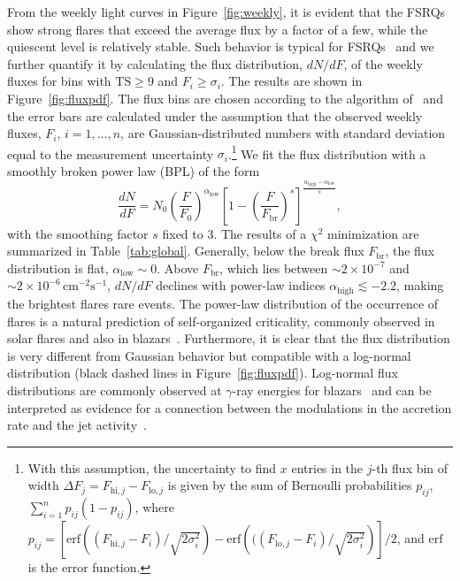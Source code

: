\documentclass[twocolumn,linenumbers]{aastex62}
\newcommand{\gray}{$\gamma$-ray\xspace}
\begin{document}
From the weekly light curves in Figure~\ref{fig:weekly}, it is evident that the FSRQs show strong flares that exceed the average flux by a factor of a few, while the quiescent level is relatively stable. 
Such behavior is typical for FSRQs~\citet{} and we 
further quantify it by calculating the flux distribution, $dN/dF$, of the weekly fluxes for bins with $\mathrm{TS} \geqslant 9$ and $F_i \geqslant \sigma_i$. 
The results are shown in Figure~\ref{fig:fluxpdf}. The flux bins are chosen according to the algorithm of~\citet{knuth2006} and the error bars are calculated under the assumption that the observed weekly fluxes, $F_i$, $i = 1,\ldots,n$, are Gaussian-distributed numbers with standard deviation equal to the measurement uncertainty $\sigma_i$.\footnote{
With this assumption, the uncertainty to find $x$ entries in the $j$-th flux bin of width $\Delta F_j = F_{\mathrm{hi},j} - F_{\mathrm{lo},j}$ is given by the sum of Bernoulli probabilities $p_{ij}$, $\sum_{i = 1}^n p_{ij}(1-p_{ij})$, where $p_{ij} =  \left[\mathrm{erf}\left((F_{\mathrm{hi},j} - F_i) / \sqrt{2\sigma_i^2}\right) - \mathrm{erf}\left(((F_{\mathrm{lo},j} - F_i) / \sqrt{2\sigma_i^2}\right)\right]/2$, and $\mathrm{erf}$ is the error function.
}
We fit the flux distribution with a smoothly broken power law (BPL) of the form 
\begin{equation}
    \frac{dN}{dF} = N_0 \left( \frac{F}{F_0}\right)^{\alpha_\mathrm{low}}
        \left[ 1 - \left(\frac{F}{F_\mathrm{br}}\right)^s \right]^{\frac{\alpha_\mathrm{high} - \alpha_\mathrm{low}}{s}},
        \label{eq:dndf}
\end{equation}
with the smoothing factor $s$ fixed to 3. 
The results of a $\chi^2$ minimization are summarized in Table~\ref{tab:global}.
Generally, below the break flux $F_\mathrm{br}$, the flux distribution is flat, $\alpha_\mathrm{low}\sim 0$.
Above $F_\mathrm{br}$, 
which lies between $\sim2\times10^{-7}$ and $\sim2\times10^{-6}\,\mathrm{cm}^{-2}\mathrm{s}^{-1}$, $dN/dF$ declines  with power-law indices $\alpha_\mathrm{high} \lesssim -2.2$, making the brightest flares rare events.
The power-law distribution of the occurrence of flares is a natural prediction of self-organized criticality, commonly observed in solar flares and also in blazars~\citep[see, e.g.,][and references therein]{2016SSRv..198...47A}.    
Furthermore, it is clear that the flux distribution is very different from Gaussian behavior but
compatible with a log-normal distribution (black dashed lines in Figure~\ref{fig:fluxpdf}). 
Log-normal flux distributions are commonly observed at \gray energies for blazars~\citep[e.g.,][]{2010A&A...524A..48T,2015ApJ...810...14A,2018arXiv180504675S}
and can be interpreted as evidence for a connection between the  
modulations in the accretion rate and the jet activity~\citep{2009A&A...503..797G}.
\end{document}
